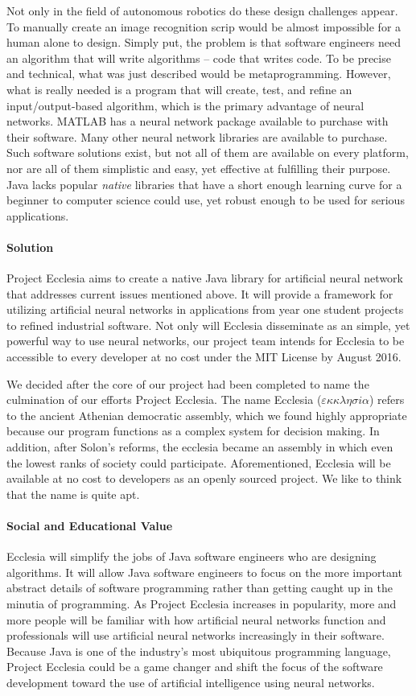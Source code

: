 \documentclass[letterpaper, 10pt]{article}
\begin{document}
	Not only in the field of autonomous robotics do these design challenges appear. To manually create an image recognition scrip would be almost impossible for a human alone to design. Simply put, the problem is that software engineers need an algorithm that will write algorithms -- code that writes code. To be precise and technical, what was just described would be metaprogramming. However, what is really needed is a program that will create, test, and refine an input/output-based algorithm, which is the primary advantage of neural networks. MATLAB has a neural network package available to purchase with their software. Many other neural network libraries are available to purchase. Such software solutions exist, but not all of them are available on every platform, nor are all of them simplistic and easy, yet effective at fulfilling their purpose. Java lacks popular \emph{native} libraries that have a short enough learning curve for a beginner to computer science could use, yet robust enough to be used for serious applications.
	\paragraph{Solution} Project Ecclesia aims to create a native Java library for artificial neural network that addresses current issues mentioned above. It will provide a framework for utilizing artificial neural networks in applications from year one student projects to refined industrial software. Not only will Ecclesia disseminate as an simple, yet powerful way to use neural networks, our project team intends for Ecclesia to be accessible to every developer at no cost under the MIT License by August 2016.
	
	We decided after the core of our project had been completed to name the culmination of our efforts Project Ecclesia. The name Ecclesia ($\varepsilon \kappa \kappa \lambda \eta \sigma i \alpha$) refers to the ancient Athenian democratic assembly, which we found highly appropriate because our program functions as a complex system for decision making. In addition, after Solon's reforms, the ecclesia became an assembly in which even the lowest ranks of society could participate. Aforementioned, Ecclesia will be available at no cost to developers as an openly sourced project. We like to think that the name is quite apt.
\clearpage
	\paragraph{Social and Educational Value} 
	Ecclesia will simplify the jobs of Java software engineers who are designing algorithms. It will allow Java software engineers to focus on the more important abstract details of software programming rather than getting caught up in the minutia of programming. As Project Ecclesia increases in popularity, more and more people will be familiar with how artificial neural networks function and professionals will use artificial neural networks increasingly in their software. Because Java is one of the industry's most ubiquitous programming language, Project Ecclesia could be a game changer and shift the focus of the software development toward the use of artificial intelligence using neural networks.
	
\end{document}
